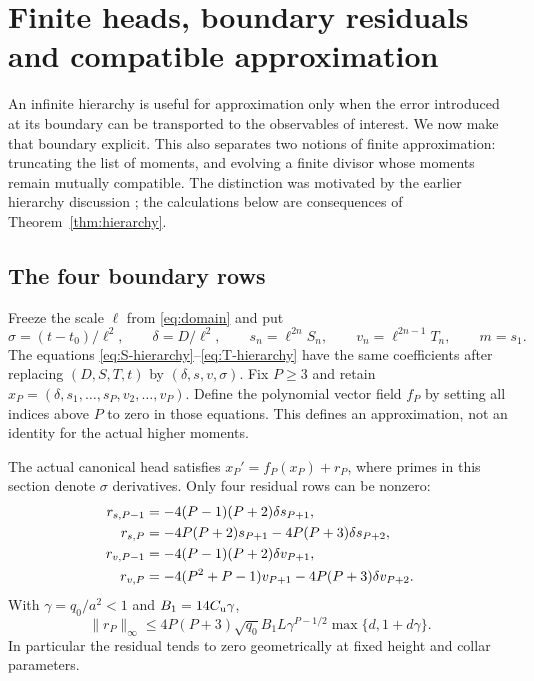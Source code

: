 \section{Finite heads, boundary residuals and compatible approximation}
\label{sec:finite}

An infinite hierarchy is useful for approximation only when the error
introduced at its boundary can be transported to the observables of
interest. We now make that boundary explicit. This also separates two
notions of finite approximation: truncating the list of moments, and
evolving a finite divisor whose moments remain mutually compatible.
The distinction was motivated by the earlier hierarchy discussion
\cite{BakerCM15}; the calculations below are consequences of
Theorem~\ref{thm:hierarchy}.

\subsection{The four boundary rows}

Freeze the scale $\ell$ from \eqref{eq:domain} and put
\begin{equation}
 \sigma=(t-t_0)/\ell^2,\qquad \delta=D/\ell^2,\qquad
 s_n=\ell^{2n}S_n,\qquad v_n=\ell^{2n-1}T_n,\qquad m=s_1.
 \label{fin:normalization}
\end{equation}
The equations \eqref{eq:S-hierarchy}--\eqref{eq:T-hierarchy} have the
same coefficients after replacing $(D,S,T,t)$ by $(\delta,s,v,\sigma)$.
Fix $P\ge3$ and retain
$x_P=(\delta,s_1,\ldots,s_P,v_2,\ldots,v_P)$.
Define the polynomial vector field $f_P$ by setting all indices above
$P$ to zero in those equations. This defines an approximation, not an
identity for the actual higher moments.

\begin{proposition}\label{fin:residual}
The actual canonical head satisfies $x_P'=f_P(x_P)+r_P$, where primes
in this section denote $\sigma$ derivatives. Only four residual rows
can be nonzero:
\begin{align}
 r_{s,P-1}&=-4(P-1)(P+2)\delta s_{P+1},\notag\\
 r_{s,P}&=-4P(P+2)s_{P+1}-4P(P+3)\delta s_{P+2},\notag\\
 r_{v,P-1}&=-4(P-1)(P+2)\delta v_{P+1},\notag\\
 r_{v,P}&=-4(P^2+P-1)v_{P+1}-4P(P+3)\delta v_{P+2}.
 \label{fin:four-rows}
\end{align}
With $\gamma=q_0/a^2<1$ and $B_1=14C_{\mathrm u}\gamma$,
\begin{equation}
 \|r_P\|_\infty\le
 4P(P+3)\sqrt{q_0}B_1L\gamma^{P-1/2}
             \max\{d,1+d\gamma\}.
 \label{fin:residual-bound}
\end{equation}
In particular the residual tends to zero geometrically at fixed height
and collar parameters.
\end{proposition}

